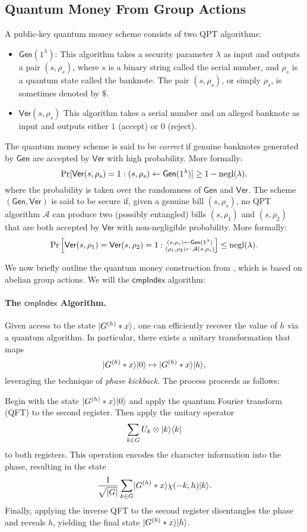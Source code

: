 \documentclass[11pt]{article}
\theoremstyle{definition}
\newcommand{\comph}{\mathsf{cmpIndex}}
\newcommand{\gen}{\mathsf{Gen}}
\newcommand{\ver}{\mathsf{Ver}}
\begin{document}
\subsection{Quantum Money From Group Actions}
A public-key quantum money scheme consists of two QPT algorithms: 
\begin{itemize}
\item $\gen(1^\lambda)$: This algorithm takes a security parameter $\lambda$ as input and outputs a pair $(s, \rho_s)$, where $s$ is a binary string called the serial number, and $\rho_s$ is a quantum state called the banknote. The pair $(s, \rho_s)$, or simply $\rho_s$, is sometimes denoted by $\$$.
\item $\ver(s, \rho_s)$ This algorithm takes a serial number and an alleged banknote as input and outputs either $1$ (accept) or $0$ (reject).
\end{itemize}

The quantum money scheme is said to be \textit{correct} if genuine banknotes generated by $\gen$ are accepted by $\ver$ with high probability. More formally:
\[ \Pr[\ver(s, \rho_s) = 1 : (s, \rho_s) \gets \gen(1^\lambda)] \ge 1 - \negl(\lambda). \]
where the probability is taken over the randomness of $\gen$ and $\ver$. The scheme $(\gen, \ver)$ is said to be secure if, given a genuine bill $(s, \rho_s)$, no QPT algorithm $\mathcal{A}$ can produce two (possibly entangled) bills $(s, \rho_1)$ and $(s, \rho_2)$ that are both accepted by $\ver$ with non-negligible probability. More formally:
\[ \Pr\left[ \ver(s, \rho_1) = \ver(s, \rho_2) = 1 : \substack{(s, \rho_s) \gets \gen(1^\lambda) \\ (\rho_1, \rho_2) \gets \mathcal{A}(s, \rho_s)} \right] \le \negl(\lambda). \]

We now briefly outline the quantum money construction from \cite{zhandry2024quantum}, which is based on abelian group actions. We will the $\comph$ algorithm:
\paragraph{The $\comph$ Algorithm.}
Given access to the state $\lvert G^{(h)} * x\rangle$, one can efficiently recover the value of $h$ via a quantum algorithm. In particular, there exists a unitary transformation that maps
\[
\lvert G^{(h)} * x\rangle \lvert0\rangle \mapsto \lvert G^{(h)} * x\rangle \lvert h\rangle,
\]
leveraging the technique of \textit{phase kickback}. The process proceeds as follows:

Begin with the state $\lvert G^{(h)} * x\rangle \lvert0\rangle$ and apply the quantum Fourier transform (QFT) to the second register. Then apply the unitary operator
\[
\sum_{k \in G} U_k \otimes \lvert k\rangle\langle k\rvert
\]
to both registers. This operation encodes the character information into the phase, resulting in the state
\[
\frac{1}{\sqrt{\lvert G\rvert}} \sum_{k \in G} \lvert G^{(h)} * x\rangle \chi(-k, h) \lvert k\rangle.
\]
Finally, applying the inverse QFT to the second register disentangles the phase and reveals $h$, yielding the final state $\lvert G^{(h)} * x\rangle \lvert h\rangle$.
\end{document}
